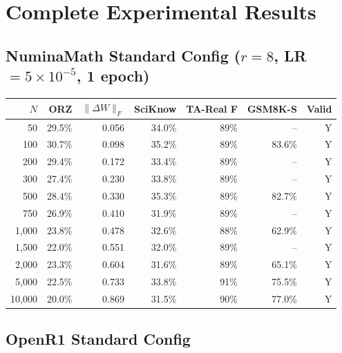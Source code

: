 \documentclass{article}
\begin{document}
\section{Complete Experimental Results}
\label{app:results}

\subsection{NuminaMath Standard Config ($r{=}8$, LR$=5{\times}10^{-5}$, 1 epoch)}

\begin{table}[h]
\centering
\small
\begin{tabular}{@{}rrrrrrr@{}}
\toprule
$N$ & ORZ & $\|\Delta W\|_F$ & SciKnow & TA-Real F & GSM8K-S & Valid \\
\midrule
50 & 29.5\% & 0.056 & 34.0\% & 89\% & -- & Y \\
100 & 30.7\% & 0.098 & 35.2\% & 89\% & 83.6\% & Y \\
200 & 29.4\% & 0.172 & 33.4\% & 89\% & -- & Y \\
300 & 27.4\% & 0.230 & 33.8\% & 89\% & -- & Y \\
500 & 28.4\% & 0.330 & 35.3\% & 89\% & 82.7\% & Y \\
750 & 26.9\% & 0.410 & 31.9\% & 89\% & -- & Y \\
1,000 & 23.8\% & 0.478 & 32.6\% & 88\% & 62.9\% & Y \\
1,500 & 22.0\% & 0.551 & 32.0\% & 89\% & -- & Y \\
2,000 & 23.3\% & 0.604 & 31.6\% & 89\% & 65.1\% & Y \\
5,000 & 22.5\% & 0.733 & 33.8\% & 91\% & 75.5\% & Y \\
10,000 & 20.0\% & 0.869 & 31.5\% & 90\% & 77.0\% & Y \\
\bottomrule
\end{tabular}
\end{table}

\subsection{OpenR1 Standard Config}
\end{document}
